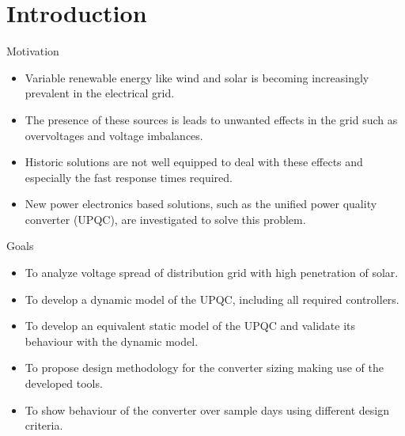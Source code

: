
\section{Introduction}

\begin{frame}{}
    \tableofcontents[currentsection]
\end{frame}


\begin{frame}{Motivation}
\begin{itemize}
    \item Variable renewable energy like wind and solar is becoming increasingly prevalent in the electrical grid.
    \item The presence of these sources is leads to unwanted effects in the grid such as overvoltages and voltage imbalances.  
    \item Historic solutions are not well equipped to deal with these effects and especially the fast response times required.
    \item New power electronics based solutions, such as the unified power quality converter (UPQC), are investigated to solve this problem.
\end{itemize}
\end{frame}


\begin{frame}{Goals}
\begin{itemize}
\item To analyze voltage spread of distribution grid with high penetration of solar.
\item To develop a dynamic model of the UPQC, including all required controllers.
\item To develop an equivalent static model of the UPQC and validate its behaviour with the dynamic model.
\item To propose design methodology for the converter sizing making use of the developed tools.
\item To show behaviour of the converter over sample days using different design criteria.
\end{itemize}
\end{frame}

